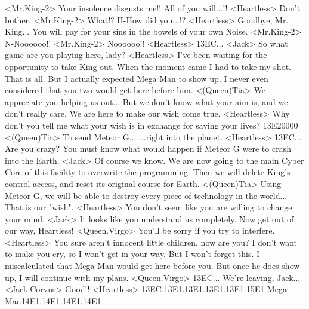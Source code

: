 <Mr.King-2> Your insolence disgusts me!! 
All of you will...!! 
<Heartless> Don't bother. 
<Mr.King-2> What!? 
H-How did you...!? 
<Heartless> Goodbye, Mr. King... 
You will pay for your sins in the bowels of your own Noise. 
<Mr.King-2> N-Noooooo!! 
<Mr.King-2> Noooooo!! 
<Heartless> {13}{EC}... 
<Jack> So what game are you playing here, lady? 
<Heartless> I've been waiting for the opportunity to take King out. 
When the moment came I had to take my shot. 
That is all. 
But I actually expected Mega Man to show up. 
I never even considered that you two would get here before him. 
<(Queen)Tia> We appreciate you helping us out... 
But we don't know what your aim is, and we don't really care. 
We are here to make our wish come true. 
<Heartless> Why don't you tell me what your wish is in exchange for saving your lives? 
{13}{E2}{00}{00} 
<(Queen)Tia> To send Meteor G... 
...right into the planet. 
<Heartless> {13}{EC}... 
Are you crazy? 
You must know what would happen if Meteor G were to crash into the Earth. 
<Jack> Of course we know. 
We are now going to the main Cyber Core of this 
facility to overwrite the programming. 
Then we will delete King's control access, and reset its original course for Earth. 
<(Queen)Tia> Using Meteor G, we will be able to destroy every piece of technology in the world... 
That is our "wish". 
<Heartless> You don't seem like you are willing to change your mind. 
<Jack> It looks like you understand us completely. Now get out of our way, Heartless! 
<Queen.Virgo> You'll be sorry if you try to interfere. 
<Heartless> You sure aren't innocent little children, now are you? 
I don't want to make you cry, so I won't get in your way. 
But I won't forget this. I miscalculated that Mega Man would get here before you. 
But once he does show up, I will continue with my plans. 
<Queen.Virgo> {13}{EC}... 
We're leaving, Jack... 
<Jack.Corvus> Good!! 
<Heartless> {13}{EC}.{13}{E1}.{13}{E1}.{13}{E1}.{13}{E1}.{15}{E1} 
Mega Man{14}{E1}.{14}{E1}.{14}{E1}.{14}{E1} 
